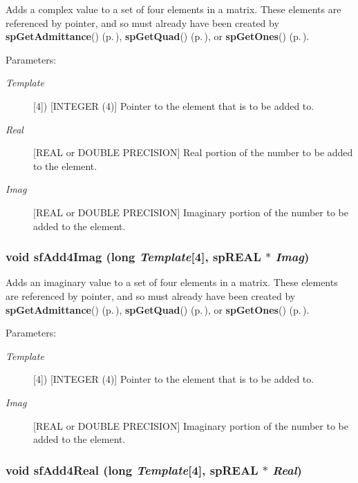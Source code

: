 Adds a complex value to a set of four elements in a matrix. These elements are referenced by pointer, and so must already have been created by {\bf sp\-Get\-Admittance}() {\rm (p.\,\pageref{spBuild_8c_a13})}, {\bf sp\-Get\-Quad}() {\rm (p.\,\pageref{spBuild_8c_a14})}, or {\bf sp\-Get\-Ones}() {\rm (p.\,\pageref{spBuild_8c_a15})}.\begin{Desc}
\item[Parameters: ]\par
\begin{description}
\item[{\em 
Template}][4]) [INTEGER (4)] Pointer to the element that is to be added to. \item[{\em 
Real}][REAL or DOUBLE PRECISION] Real portion of the number to be added to the element. \item[{\em 
Imag}][REAL or DOUBLE PRECISION] Imaginary portion of the number to be added to the element. \end{description}
\end{Desc}
\subsubsection{\setlength{\rightskip}{0pt plus 5cm}void sf\-Add4Imag (long {\em Template}[4], sp\-REAL $\ast$ {\em Imag})}\label{spFortran_8c_a59}


Adds an imaginary value to a set of four elements in a matrix. These elements are referenced by pointer, and so must already have been created by {\bf sp\-Get\-Admittance}() {\rm (p.\,\pageref{spBuild_8c_a13})}, {\bf sp\-Get\-Quad}() {\rm (p.\,\pageref{spBuild_8c_a14})}, or {\bf sp\-Get\-Ones}() {\rm (p.\,\pageref{spBuild_8c_a15})}.\begin{Desc}
\item[Parameters: ]\par
\begin{description}
\item[{\em 
Template}][4]) [INTEGER (4)] Pointer to the element that is to be added to. \item[{\em 
Imag}][REAL or DOUBLE PRECISION] Imaginary portion of the number to be added to the element. \end{description}
\end{Desc}
\subsubsection{\setlength{\rightskip}{0pt plus 5cm}void sf\-Add4Real (long {\em Template}[4], sp\-REAL $\ast$ {\em Real})}\label{spFortran_8c_a58}


